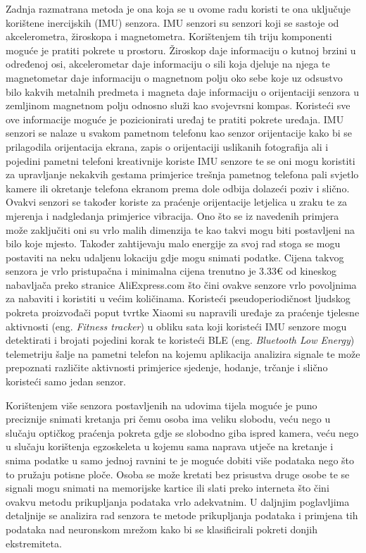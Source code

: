\documentclass[times, utf8, diplomski]{fer}
\begin{document}
Zadnja razmatrana metoda je ona koja se u ovome radu koristi te ona uključuje korištene inercijskih (IMU) senzora. IMU senzori su
senzori koji se sastoje od akcelerometra, žiroskopa i magnetometra. Korištenjem tih triju komponenti moguće je pratiti pokrete u
prostoru. Žiroskop daje informaciju o kutnoj brzini u određenoj osi, akcelerometar daje informaciju o sili koja djeluje na njega
te magnetometar daje informaciju o magnetnom polju oko sebe koje uz odsustvo bilo kakvih metalnih predmeta i magneta daje informaciju
o orijentaciji senzora u zemljinom magnetnom polju odnosno služi kao svojevrsni kompas. Koristeći sve ove informacije moguće je
pozicionirati uređaj te pratiti pokrete uređaja. IMU senzori se nalaze u svakom pametnom telefonu kao senzor orijentacije kako bi se
prilagodila orijentacija ekrana, zapis o orijentaciji uslikanih fotografija ali i pojedini pametni telefoni kreativnije koriste IMU
senzore te se oni mogu koristiti za upravljanje nekakvih gestama primjerice trešnja pametnog telefona pali svjetlo kamere ili
okretanje telefona ekranom prema dole odbija dolazeći poziv i slično. Ovakvi senzori se također koriste za praćenje orijentacije
letjelica u zraku te za mjerenja i nadgledanja primjerice vibracija. Ono što se iz navedenih primjera može zaključiti oni su vrlo
malih dimenzija te kao takvi mogu biti postavljeni na bilo koje mjesto. Također zahtijevaju malo energije za svoj rad stoga se mogu
postaviti na neku udaljenu lokaciju gdje mogu snimati podatke. Cijena takvog senzora je vrlo pristupačna i minimalna cijena trenutno
je 3.33€ od kineskog nabavljača preko stranice AliExpress.com što čini ovakve senzore vrlo povoljnima za nabaviti i koristiti u
većim količinama. Koristeći pseudoperiodičnost ljudskog pokreta proizvođači poput tvrtke Xiaomi su napravili uređaje za praćenje
tjelesne aktivnosti (eng. \textit{Fitness tracker}) u obliku sata koji koristeći IMU senzore mogu detektirati i brojati pojedini korak 
te koristeći BLE (eng. \textit{Bluetooth Low Energy}) telemetriju šalje na pametni telefon na kojemu aplikacija analizira signale
te može prepoznati različite aktivnosti primjerice sjedenje, hodanje, trčanje i slično koristeći samo jedan senzor.

Korištenjem više senzora postavljenih na udovima tijela moguće je puno preciznije snimati kretanja pri čemu osoba ima veliku slobodu,
veću nego u slučaju optičkog praćenja pokreta gdje se slobodno giba ispred kamera, veću nego u slučaju korištenja egzoskeleta u
kojemu sama naprava utječe na kretanje i snima podatke u samo jednoj ravnini te je moguće dobiti više podataka nego što to pružaju
potisne ploče. Osoba se može kretati bez prisustva druge osobe te se signali mogu snimati na memorijske kartice ili slati preko
interneta što čini ovakvu metodu prikupljanja podataka vrlo adekvatnim. U daljnjim poglavljima detaljnije se analizira
rad senzora te metode prikupljanja podataka i primjena tih podataka nad neuronskom mrežom kako bi se klasificirali pokreti donjih
ekstremiteta.
\end{document}
